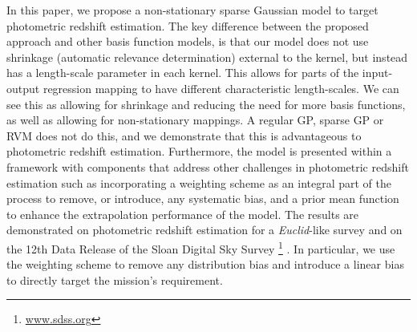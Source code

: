 \documentclass[useAMS,usenatbib,fleqn]{mn2e}
\begin{document}
In this paper, we propose a non-stationary sparse Gaussian model to target photometric redshift estimation. The key difference between the proposed approach and other basis function models, is that our model does not use shrinkage (automatic relevance determination) external to the kernel, but instead has a length-scale parameter in each kernel. This allows for parts of the input-output regression mapping to have different characteristic length-scales. We can see this as allowing for shrinkage and reducing the need for more basis functions, as well as allowing for non-stationary mappings. A regular GP, sparse GP or RVM does not do this, and we demonstrate that this is advantageous to photometric redshift estimation. Furthermore, the model is presented within a framework with components that address other challenges in photometric redshift estimation such as incorporating a weighting scheme as an integral part of the process to remove, or introduce, any systematic bias, and a prior mean function to enhance the extrapolation performance of the model. The results are demonstrated on photometric redshift estimation for a {\em Euclid}-like survey \citep{laureijs2011} and on the 12th Data Release of the Sloan Digital Sky Survey \citep{SDSS3}\footnote{\url{www.sdss.org}} . In particular, we use the weighting scheme to remove any distribution bias and introduce a linear bias to directly target the mission's requirement. 
\end{document}
